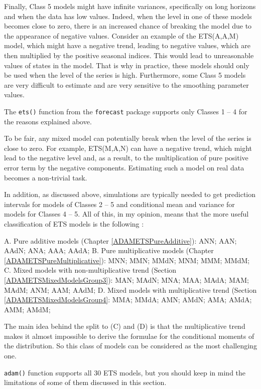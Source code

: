 \documentclass[
]{book}
\theoremstyle{definition}
\theoremstyle{definition}
\theoremstyle{definition}
\theoremstyle{definition}
\theoremstyle{remark}
\begin{document}
Finally, Class 5 models might have infinite variances, specifically on long horizons and when the data has low values. Indeed, when the level in one of these models becomes close to zero, there is an increased chance of breaking the model due to the appearance of negative values. Consider an example of the ETS(A,A,M) model, which might have a negative trend, leading to negative values, which are then multiplied by the positive seasonal indices. This would lead to unreasonable values of states in the model. That is why in practice, these models should only be used when the level of the series is high. Furthermore, some Class 5 models are very difficult to estimate and are very sensitive to the smoothing parameter values.

The \texttt{ets()} function from the \texttt{forecast} package supports only Classes 1 -- 4 for the reasons explained above.

To be fair, any mixed model can potentially break when the level of the series is close to zero. For example, ETS(M,A,N) can have a negative trend, which might lead to the negative level and, as a result, to the multiplication of pure positive error term by the negative components. Estimating such a model on real data becomes a non-trivial task.

In addition, as discussed above, simulations are typically needed to get prediction intervals for models of Classes 2 -- 5 and conditional mean and variance for models for Classes 4 -- 5. All of this, in my opinion, means that the more useful classification of ETS models is the following \citep[this classification was first proposed by][]{Akram2009}:

A. Pure additive models (Chapter \ref{ADAMETSPureAdditive}): ANN; AAN; AAdN; ANA; AAA; AAdA;
B. Pure multiplicative models (Chapter \ref{ADAMETSPureMultiplicative}): MNN; MMN; MMdN; MNM; MMM; MMdM;
C. Mixed models with non-multiplicative trend (Section \ref{ADAMETSMixedModelsGroup3}): MAN; MAdN; MNA; MAA; MAdA; MAM; MAdM; ANM; AAM; AAdM;
D. Mixed models with multiplicative trend (Section \ref{ADAMETSMixedModelsGroup4}: MMA; MMdA; AMN; AMdN; AMA; AMdA; AMM; AMdM;

The main idea behind the split to (C) and (D) is that the multiplicative trend makes it almost impossible to derive the formulae for the conditional moments of the distribution. So this class of models can be considered as the most challenging one.

\texttt{adam()} function supports all 30 ETS models, but you should keep in mind the limitations of some of them discussed in this section.
\end{document}
